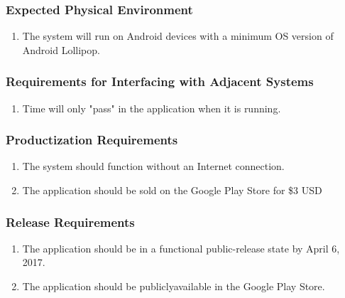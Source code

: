 \documentclass[]{article}
\begin{document}
\subsubsection{Expected Physical Environment}
\label{ssub:expected_physical_environment}
\begin{enumerate}[{OE}1. ]
	\item The system will run on Android devices with a minimum OS version of Android Lollipop.

\end{enumerate}

\subsubsection{Requirements for Interfacing with Adjacent Systems}
\label{ssub:requirements_for_interfacing_with_adjacent_systems}
\begin{enumerate}[{OE}1. ]
	\item Time will only "pass" in the application when it is running.
\end{enumerate}

\subsubsection{Productization Requirements}
\label{ssub:productization_requirements}
\begin{enumerate}[{OE}1. ]
	\item The system should function without an Internet connection.
	\item The application should be sold on the Google Play Store for \$3 USD
\end{enumerate}

\subsubsection{Release Requirements}
\label{ssub:release_requirements}
\begin{enumerate}[{OE}1. ]
	\item The application should be in a functional public-release state by April 6, 2017.
	\item The application should be publicly\-available in the Google Play Store.
\end{enumerate}

\end{document}
